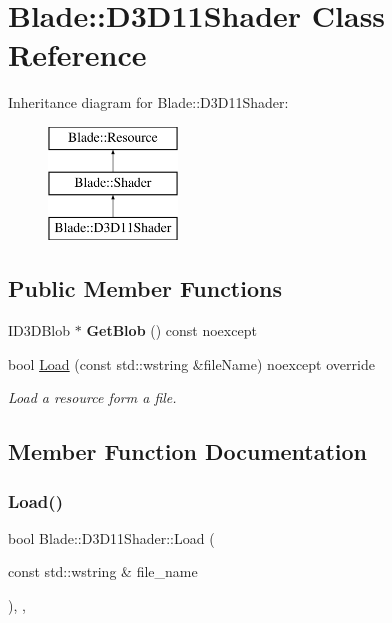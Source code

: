 \hypertarget{class_blade_1_1_d3_d11_shader}{}\section{Blade\+:\+:D3\+D11\+Shader Class Reference}
\label{class_blade_1_1_d3_d11_shader}
Inheritance diagram for Blade\+:\+:D3\+D11\+Shader\+:\begin{figure}[H]
\begin{center}
\leavevmode
\includegraphics[height=3.000000cm]{class_blade_1_1_d3_d11_shader}
\end{center}
\end{figure}
\subsection*{Public Member Functions}
\begin{DoxyCompactItemize}
\item 
\mbox{\label{class_blade_1_1_d3_d11_shader_a3e46be884a59d7bf6ac3142e4f8c8626}} 
I\+D3\+D\+Blob $\ast$ {\bfseries Get\+Blob} () const noexcept
\item 
bool \hyperlink{class_blade_1_1_d3_d11_shader_a713231594415a37d484f115478acf084}{Load} (const std\+::wstring \&file\+Name) noexcept override
\begin{DoxyCompactList}\small\item\em Load a resource form a file. \end{DoxyCompactList}\end{DoxyCompactItemize}


\subsection{Member Function Documentation}
\mbox{\label{class_blade_1_1_d3_d11_shader_a713231594415a37d484f115478acf084}} 
\subsubsection{\texorpdfstring{Load()}{Load()}}
{\footnotesize\ttfamily bool Blade\+::\+D3\+D11\+Shader\+::\+Load (\begin{DoxyParamCaption}\item[{const std\+::wstring \&}]{file\+\_\+name }\end{DoxyParamCaption})\hspace{0.3cm}{\ttfamily [override]}, {\ttfamily [virtual]}, {\ttfamily [noexcept]}}



